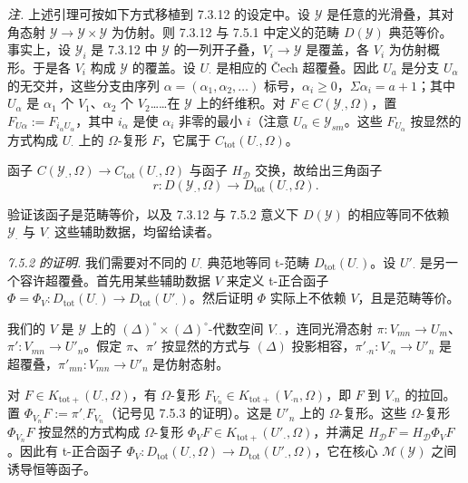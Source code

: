  \emph{注.} 上述引理可按如下方式移植到 7.3.12 的设定中。设 $\mathcal{Y}$ 是任意的光滑叠，其对角态射 $\mathcal{Y}\to\mathcal{Y}\times\mathcal{Y}$ 为仿射。则 7.3.12 与 7.5.1 中定义的范畴 $D(\mathcal{Y})$ 典范等价。事实上，设 $\mathcal{Y}_{i}$ 是 7.3.12 中 $\mathcal{Y}$ 的一列开子叠，$V_{i}\to\mathcal{Y}$ 是覆盖，各 $V_{i}$ 为仿射概形。于是各 $V_{i}$ 构成 $\mathcal{Y}$ 的覆盖。设 $U_{\cdot}$ 是相应的 Čech 超覆叠。因此 $U_{a}$ 是分支 $U_{\alpha}$ 的无交并，这些分支由序列 $\alpha=(\alpha_{1},\alpha_{2},\ldots)$ 标号，$\alpha_{i}\ge0$，$\Sigma\alpha_{i}=a+1$；其中 $U_{\alpha}$ 是 $\alpha_{1}$ 个 $V_{1}$、$\alpha_{2}$ 个 $V_{2}$……在 $\mathcal{Y}$ 上的纤维积。对 $F\in C(\mathcal{Y}_{\cdot},\Omega)$，置 $F_{U\alpha}:=F_{i_{\alpha}U_{\alpha}}$，其中 $i_{\alpha}$ 是使 $\alpha_{i}$ 非零的最小 $i$（注意 $U_{\alpha}\in\mathcal{Y}_{sm}$。这些 $F_{U_{\alpha}}$ 按显然的方式构成 $U_{\cdot}$ 上的 $\Omega$-复形 $F$，它属于 $C_{\mathrm{tot}}(U_{\cdot},\Omega)$。


函子 $C(\mathcal{Y}_{\cdot},\Omega)\to C_{\mathrm{tot}}(U_{\cdot},\Omega)$ 与函子 $H_{\mathcal{D}}$ 交换，故给出三角函子
\begin{equation}\tag{317}
r:D(\mathcal{Y}_{\cdot},\Omega)\to D_{\mathrm{tot}}(U_{\cdot},\Omega).
\end{equation}

验证该函子是范畴等价，以及 7.3.12 与 7.5.2 意义下 $D(\mathcal{Y})$ 的相应等同不依赖 $\mathcal{Y}_{\cdot}$ 与 $V_{\cdot}$ 这些辅助数据，均留给读者。

 \emph{7.5.2 的证明.} 我们需要对不同的 $U_{\cdot}$ 典范地等同 t-范畴 $D_{\mathrm{tot}}(U_{\cdot})$。设 $U'_{\cdot}$ 是另一个容许超覆叠。首先用某些辅助数据 $V$ 来定义 t-正合函子 $\Phi=\Phi_{V}:D_{\mathrm{tot}}(U_{\cdot})\to D_{\mathrm{tot}}(U'_{\cdot})$。然后证明 $\Phi$ 实际上不依赖 $V$，且是范畴等价。

我们的 $V$ 是 $\mathcal{Y}$ 上的 $(\Delta)^{\circ}\times(\Delta)^{\circ}$-代数空间 $V_{\cdot\cdot}$，连同光滑态射 $\pi:V_{mn}\to U_{m}$、$\pi':V_{mn}\to U'_{n}$。假定 $\pi$、$\pi'$ 按显然的方式与 $(\Delta)$ 投影相容，$\pi'_{\cdot n}:V_{\cdot n}\to U'_{n}$ 是超覆叠，$\pi'_{mn}:V_{mn}\to U'_{n}$ 是仿射态射。

对 $F\in K_{\mathrm{tot}+}(U_{\cdot},\Omega)$，有 $\Omega$-复形 $F_{V_{n}}\in K_{\mathrm{tot}+}(V_{\cdot n},\Omega)$，即 $F$ 到 $V_{\cdot n}$ 的拉回。置 $\Phi_{V_{n}}F:=\pi'_{\cdot}F_{V_{n}}$（记号见 7.5.3 的证明）。这是 $U'_{n}$ 上的 $\Omega$-复形。这些 $\Omega$-复形 $\Phi_{V_{n}}F$ 按显然的方式构成 $\Omega$-复形 $\Phi_{V}F\in K_{\mathrm{tot}+}(U'_{\cdot},\Omega)$，并满足 $H_{\mathcal{D}}F=H_{\mathcal{D}}\Phi_{V}F$。因此有 t-正合函子 $\Phi_{V}:D_{\mathrm{tot}}(U_{\cdot},\Omega)\to D_{\mathrm{tot}}(U'_{\cdot},\Omega)$，它在核心 $\mathcal{M}(\mathcal{Y})$ 之间诱导恒等函子。

